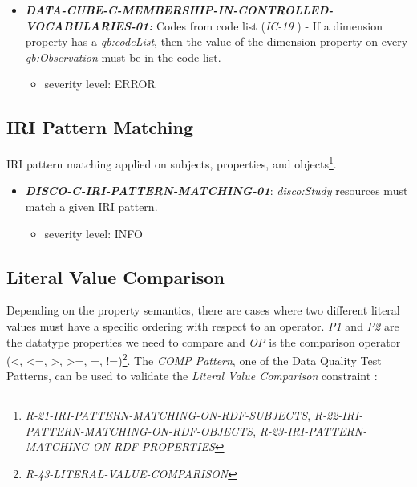 \documentclass{llncs}
\begin{document}
\begin{itemize}
	\item \textbf{{\em DATA-CUBE-C-MEMBERSHIP-IN-CONTROLLED-VOCABULARIES-01:}}
	Codes from code list (\emph{IC-19} \cite{CyganiakReynolds2014}) - 
	If a dimension property has a \emph{qb:codeList}, then the value of the dimension property on every \emph{qb:Observation} must be in the code list. 
	\begin{itemize}
		\item severity level: ERROR
	\end{itemize}
\end{itemize}

\subsection{IRI Pattern Matching}

IRI pattern matching applied on subjects, properties, and objects\footnote{\emph{R-21-IRI-PATTERN-MATCHING-ON-RDF-SUBJECTS}, \emph{R-22-IRI-PATTERN-MATCHING-ON-RDF-OBJECTS}, \emph{R-23-IRI-PATTERN-MATCHING-ON-RDF-PROPERTIES}}.

\begin{itemize}
	\item \textbf{{\em DISCO-C-IRI-PATTERN-MATCHING-01}}: \emph{disco:Study} resources must match a given IRI pattern.
	\begin{itemize}
		\item severity level: INFO
	\end{itemize}
\end{itemize}

\subsection{Literal Value Comparison}

Depending on the property semantics,
there are cases where two different literal values must have
a specific ordering with respect to an operator. 
\emph{P1} and \emph{P2} are the datatype properties we need to compare and 
\emph{OP} is the comparison operator (\textless, \textless=, \textgreater, \textgreater=, =, !=)\footnote{{\em R-43-LITERAL-VALUE-COMPARISON}}.
The {\em COMP Pattern}, one of the Data Quality Test Patterns, can be used to validate the {\em Literal Value Comparison} constraint \cite{Kontokostas2014}:

\end{document}
